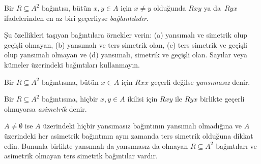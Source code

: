 \begin{defn}[Bağlantılılık]
Bir $R \subseteq A^2$ bağıntısı, bütün $x,y\in A$ için $x\neq y$ olduğunda
$Rxy$ ya da~$Ryx$ ifadelerinden en az biri geçerliyse \emph{bağlantılıdır}.
\end{defn}

\begin{prob}
Şu özellikleri taşıyan bağıntılara örnekler verin: (a) yansımalı ve simetrik
olup geçişli olmayan, (b) yansımalı ve ters simetrik olan, (c) ters simetrik ve
geçişli olup yansımalı olmayan ve (d) yansımalı, simetrik ve geçişli olan.
Sayılar veya kümeler üzerindeki bağıntıları kullanmayın.
\end{prob}

\begin{defn}[Yansımasızlık]
Bir $R \subseteq A^2$ bağıntısına, bütün $x \in A$ için $Rxx$ geçerli değilse
\emph{yansımasız} denir.
\end{defn}

\begin{defn}[Asimetriklik]
Bir $R \subseteq A^2$ bağıntısına, hiçbir $x,y\in A$ ikilisi için $Rxy$ ile
$Ryx$ birlikte geçerli olmuyorsa \emph{asimetrik} denir.
\end{defn}

$A \neq \emptyset$ ise $A$ üzerindeki hiçbir yansımasız bağıntının yansımalı
olmadığına ve $A$ üzerindeki her asimetrik bağıntının aynı zamanda ters
simetrik olduğuna dikkat edin. Bununla birlikte yansımalı da yansımasız da
olmayan $R \subseteq A^2$ bağıntıları ve asimetrik olmayan ters
simetrik bağıntılar vardır.

